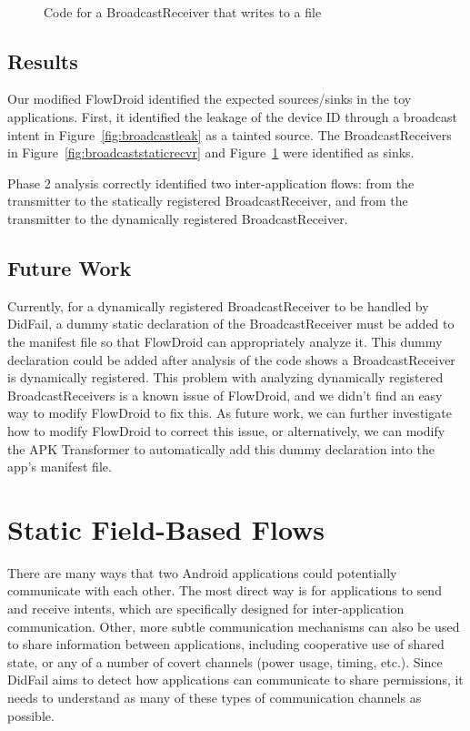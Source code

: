\
\begin{figure}[!h]
\begin{framed}

\caption{Code for a BroadcastReceiver that writes to a file}
\label{fig:broadcastdynrecvr}
\end{framed}
\end{figure}

\section{Results}

Our modified FlowDroid identified the expected sources/sinks in the toy applications. First, it identified the leakage of the device ID through a broadcast intent in Figure~\ref{fig:broadcastleak} as a tainted source. The BroadcastReceivers in Figure~\ref{fig:broadcaststaticrecvr} and Figure~\ref{fig:broadcastdynrecvr} were identified as sinks.

Phase 2 analysis correctly identified two inter-application flows: from the transmitter to the statically registered BroadcastReceiver, and from the transmitter to the dynamically registered BroadcastReceiver.

\section{Future Work}
Currently, for a dynamically registered BroadcastReceiver to be handled by DidFail, a dummy static declaration of the BroadcastReceiver must be added to the manifest file so that FlowDroid can appropriately analyze it. This dummy declaration could be added after analysis of the code shows a BroadcastReceiver is dynamically registered. This problem with analyzing dynamically registered BroadcastReceivers is a known issue of FlowDroid, and we didn't find an easy way to modify FlowDroid to fix this. As future work, we can further investigate how to modify FlowDroid to correct this issue, or alternatively, we can modify the APK Transformer to automatically add this dummy declaration into the app's manifest file.


\newpage
\chapter{Static Field-Based Flows}

There are many ways that two Android applications could potentially communicate with each other. The most direct way is for applications to send and receive intents, which are specifically designed for inter-application communication. Other, more subtle communication mechanisms can also be used to share information between applications, including cooperative use of shared state, or any of a number of covert channels (power usage, timing, etc.). Since DidFail aims to detect how applications can communicate to share permissions, it needs to understand as many of these types of communication channels as possible.

